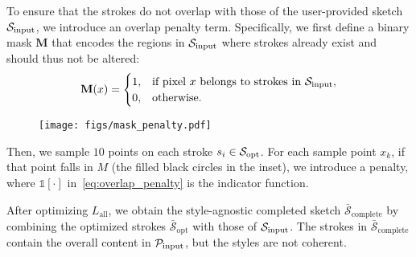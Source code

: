 To ensure that the strokes do not overlap with those of the user-provided sketch $\mathcal{S}_{\mathrm{input}}$, we introduce an overlap penalty term. 
Specifically, we first define a binary mask $\mathbf{M}$ that encodes the regions in $\mathcal{S}_{\mathrm{input}}$ where strokes already exist and should thus not be altered:
\begin{equation}
    \mathbf{M}(x) = 
    \begin{cases}
    1, & \text{if pixel } x \text{ belongs to strokes in } \mathcal{S}_{\mathrm{input}}, \\
    0, & \text{otherwise}.
    \end{cases}
\end{equation}

\begin{wrapfigure}{r}{0.12\textwidth}
\texttt{[image: figs/mask\_penalty.pdf]}
\end{wrapfigure} 
Then, we sample $10$ points on each stroke $s_i \in \mathcal{S}_{\mathrm{opt}}$.
For each sample point $x_k$, if that point falls in $M$ (the filled black circles in the inset), we introduce a penalty, where $\mathds{1}[\cdot]$ in~\cref{eq:overlap_penalty} is the indicator function.

After optimizing $L_{\mathrm{all}}$, we obtain the style-agnostic completed sketch $\mathcal{\bar{S}}_\mathrm{complete}$ by combining the optimized strokes $\mathcal{\bar{S}}_{\mathrm{opt}}$ with those of $\mathcal{S}_{\mathrm{input}}$.
The strokes in $\mathcal{\bar{S}}_\mathrm{complete}$ contain the overall content in $\mathcal{P}_{\mathrm{input}}$, but the styles are not coherent.














